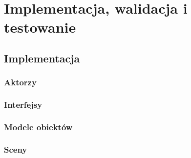 \chapter{Implementacja, walidacja i testowanie}
\label{chap:implementation}

\section{Implementacja}

\subsection{Aktorzy}

\subsection{Interfejsy}

\subsection{Modele obiektów}

\subsection{Sceny}
